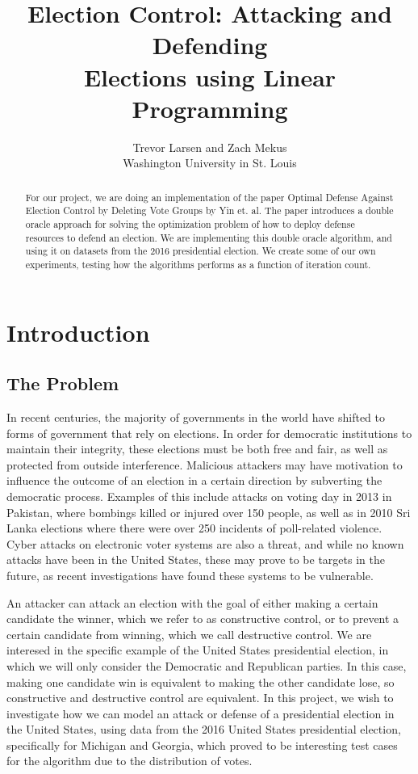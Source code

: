 \documentclass[letterpaper]{article} %
\begin{document}
%
\title{Election Control: Attacking and Defending\\ Elections using Linear Programming}
\author{Trevor Larsen and Zach Mekus\\
Washington University in St. Louis
}
\maketitle
\begin{abstract}
For our project, we are doing an implementation of the paper Optimal Defense Against Election Control by Deleting Vote Groups by Yin et. al. The paper introduces a double oracle approach for solving the optimization problem of how to deploy defense resources to defend an election. We are implementing this double oracle algorithm, and using it on datasets from the 2016 presidential election. We create some of our own experiments, testing how the algorithms performs as a function of iteration count.
\end{abstract}

\section{Introduction}
\subsection{The Problem}

In recent centuries, the majority of governments in the world have shifted to forms of government that rely on elections. In order for democratic institutions to maintain their integrity, these elections must be both free and fair, as well as protected from outside interference. Malicious attackers may have motivation to influence the outcome of an election in a certain direction by subverting the democratic process. Examples of this include attacks on voting day in 2013 in Pakistan, where bombings killed or injured over 150 people, as well as in 2010 Sri Lanka elections where there were over 250 incidents of poll-related violence. Cyber attacks on electronic voter systems are also a threat, and while no known attacks have been  in the United States, these may prove to be targets in the future, as recent investigations have found these systems to be vulnerable. 

An attacker can attack an election with the goal of either making a certain candidate the winner, which we refer to as constructive control, or to prevent a certain candidate from winning, which we call destructive control. We are interesed in the specific example of the United States presidential election, in which we will only consider the Democratic and Republican parties. In this case, making one candidate win is equivalent to making the other candidate lose, so constructive and destructive control are equivalent. In this project, we wish to investigate how we can model an attack or defense of a presidential election in the United States, using data from the 2016 United States presidential election, specifically for Michigan and Georgia, which proved to be interesting test cases for the algorithm due to the distribution of votes.
\end{document}
